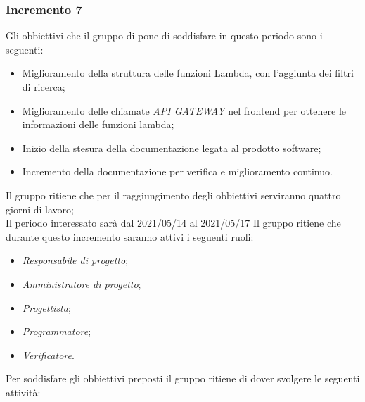 \subsubsection{Incremento 7}
Gli obbiettivi che il gruppo di pone di soddisfare in questo periodo sono i seguenti:
\begin{itemize}
    \item Miglioramento della struttura delle funzioni Lambda, con l'aggiunta dei filtri di ricerca;
    \item Miglioramento delle chiamate \textit{API GATEWAY} nel frontend per ottenere le informazioni delle funzioni lambda;
    \item Inizio della stesura della documentazione legata al prodotto software;
    \item Incremento della documentazione per verifica e miglioramento continuo.
\end{itemize}
Il gruppo ritiene che per il raggiungimento degli obbiettivi serviranno quattro giorni di lavoro;\\
Il periodo interessato sarà dal 2021/05/14 al 2021/05/17
Il gruppo ritiene che durante questo incremento saranno attivi i seguenti ruoli:
\begin{itemize}
    \item \textit{Responsabile di progetto};
    \item \textit{Amministratore di progetto};
    \item \textit{Progettista};
    \item \textit{Programmatore};
    \item \textit{Verificatore}.
\end{itemize}
Per soddisfare gli obbiettivi preposti il gruppo ritiene di dover svolgere le seguenti attività:
